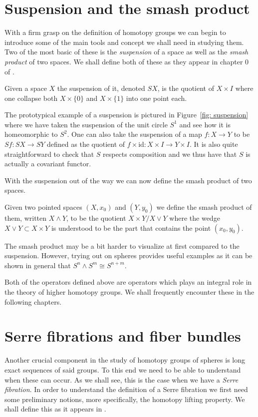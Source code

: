 \documentclass[../main.tex]{subfiles}
\begin{document}
\section{Suspension and the smash product}
With a firm grasp on the definition of homotopy groups we can begin
to introduce some of the main tools and concept we shall need in
studying them. Two of the most basic of these is the \emph{suspension} of a
space as well as the \emph{smash product} of two spaces. We shall define both
of these as they appear in chapter 0 of \cite{Hat02}.
\begin{definition}[Suspension]
    Given a space \( X \) the suspension of it, denoted \( SX \), is
    the quotient of \( X\times I \) where one collapse both \( X\times
    \{0\}\) and \( X\times \{1\} \) into one point each.
\end{definition}
The prototypical example of a suspension is pictured in Figure~\ref{fig:
suspension} where we have taken the suspension of the unit circle \( S^1 \)
and see how it is homeomorphic to \( S^2 \). One can also take the
suspension of a map \( f:X\rightarrow Y \) to be \( Sf:SX\rightarrow
SY\) defined as the quotient of \( f\times \text{id}:X\times I \rightarrow
Y \times I\). It is also quite straightforward to check that
\( S \) respects composition
and we thus have that \( S \) is actually a covariant functor.

With the suspension out of the way we can now define the smash product
of two spaces.
\begin{definition}
    Given two pointed spaces \( (X, x_0) \) and \( (Y, y_0) \) we define
    the smash product of
    them, written \( X \wedge Y \), to be the quotient \( X \times
    Y/X\vee Y\) where the wedge \( X \vee Y \subset X\times Y\) is
    understood to be the part that contains the point \( (x_0, y_0) \).
\end{definition}
The smash product may be a bit harder to visualize at first compared
to the suspension. However, trying out on spheres provides useful
examples as it can be shown in general that \( S^n \wedge S^m
\cong S^{n+m}\).

Both of the operators defined above are operators which
plays an integral role in the theory of higher homotopy groups. We shall
frequently encounter these in the following chapters.

\section{Serre fibrations and fiber bundles}
Another crucial component in the study of homotopy groups of spheres is
long exact sequences of said groups. To this end we need to be able
to understand when these can occur. As we shall see, this is the case
when we have a \emph{Serre fibration}. In order to understand the
definition of a Serre fibration we first need some preliminary notions,
more specifically, the homotopy lifting property. We shall define this
as it appears in \cite{Mit01}.
\end{document}
